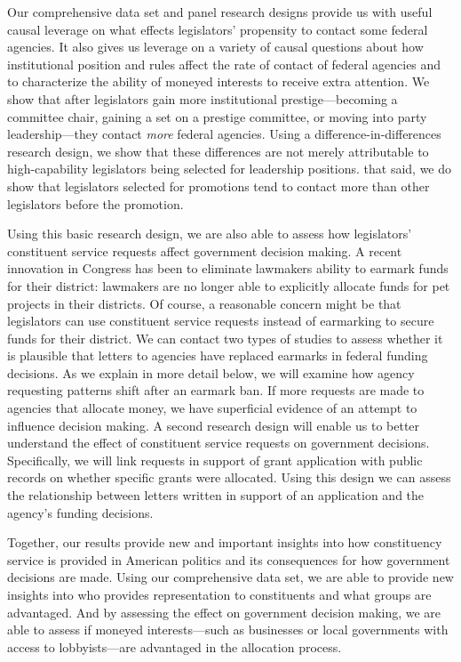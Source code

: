 \documentclass{article}
\begin{document}
Our comprehensive data set and panel research designs provide us with useful causal leverage on what effects legislators' propensity to contact some federal agencies.  It also gives us leverage on a variety of causal questions about how institutional position and rules affect the rate of contact of federal agencies and to characterize the ability of moneyed interests to receive extra attention.  We show that after legislators gain more institutional prestige---becoming a committee chair, gaining a set on a prestige committee, or moving into party leadership---they contact \emph{more} federal agencies.  Using a difference-in-differences research design, we show that these differences are not merely attributable to high-capability legislators being selected for leadership positions.  that said, we do show that legislators selected for promotions tend to contact more than other legislators before the promotion.  

Using this basic research design, we are also able to assess how legislators' constituent service requests affect government decision making.  A recent innovation in Congress has been to eliminate lawmakers ability to earmark funds for their district: lawmakers are no longer able to explicitly allocate funds for pet projects in their districts.  Of course, a reasonable concern might be that legislators can use constituent service requests instead of earmarking to secure funds for their district.  We can contact two types of studies to assess whether it is plausible that letters to agencies have replaced earmarks in federal funding decisions.  As we explain in more detail below, we will examine how agency requesting patterns shift after an earmark ban. If more requests are made to agencies that allocate money, we have superficial evidence of an attempt to influence decision making.  A second research design will enable us to better understand the effect of constituent service requests on government decisions.  Specifically, we will link requests in support of grant application with public records on whether specific grants were allocated.  Using this design we can assess the relationship between letters written in support of an application and the agency's funding decisions.  


Together, our results provide new and important insights into how constituency service is provided in American politics and its consequences for how government decisions are made.  Using our comprehensive data set, we are able to provide new insights into who provides representation to constituents and what groups are advantaged.  And by assessing the effect on government decision making, we are able to assess if moneyed interests---such as businesses or local governments with access to lobbyists---are advantaged in the allocation process. 
\end{document}
